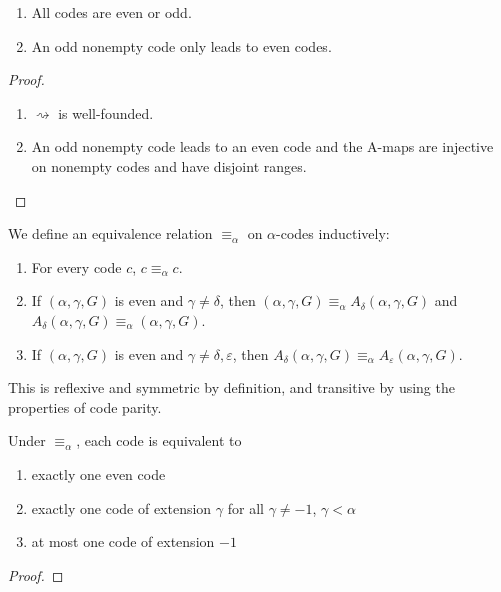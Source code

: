 \begin{lemma}
\label {lem:code-parity-properties}
\leanok
\begin{enumerate}
\item All codes are even or odd.
\item An odd nonempty code only leads to even codes.
\end{enumerate}
\end{lemma}
\begin{proof}
\begin{enumerate}
\item $\rightsquigarrow$ is well-founded.
\item An odd nonempty code leads to an even code and the A-maps are injective on nonempty codes and have disjoint ranges.
\end{enumerate}
\end{proof}

\begin{definition}
\label {def:code-equiv}
\leanok
We define an equivalence relation $\equiv_\alpha$ on $\alpha$-codes inductively:
\begin{enumerate}
\item For every code $c$, $c \equiv_\alpha c$.
\item If $(\alpha,\gamma,G)$ is even and $\gamma \neq \delta$, then $(\alpha,\gamma,G) \equiv_\alpha A_\delta (\alpha,\gamma,G)$ and $A_\delta (\alpha,\gamma,G) \equiv_\alpha (\alpha,\gamma,G)$.
\item If $(\alpha,\gamma,G)$ is even and $\gamma \neq \delta, \varepsilon$, then $A_\delta (\alpha,\gamma,G) \equiv_\alpha A_\varepsilon (\alpha,\gamma,G)$.
\end{enumerate}

This is reflexive and symmetric by definition, and transitive by using the properties of code parity.
\end{definition}

\begin{lemma}
\label{lem:code-equiv-properties}
\leanok
{}
Under $\equiv_\alpha$, each code is equivalent to
\begin{enumerate}
\item exactly one even code
\item exactly one code of extension $\gamma$ for all $\gamma \ne -1$, $\gamma < \alpha$
\item at most one code of extension $-1$
\end{enumerate}
\end{lemma}
\begin{proof}
\leanok
\end{proof}

